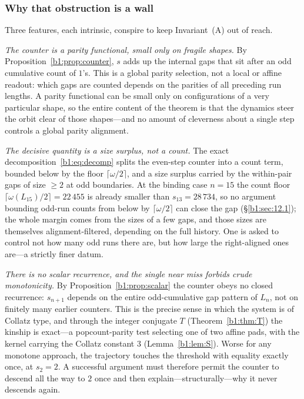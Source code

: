 \documentclass[a4paper]{article}
\theoremstyle{plain}
\theoremstyle{definition}
\theoremstyle{remark}
\begin{document}
\subsubsection{Why that obstruction is a wall}\label{b1:sec:13.2}
Three features, each intrinsic, conspire to keep Invariant~(A) out of reach.

\emph{The counter is a parity functional, small only on fragile shapes.} By Proposition~\ref{b1:prop:counter}, $s$ adds up the internal gaps that sit after an odd cumulative count of $1$'s. This is a global parity selection, not a local or affine readout: which gaps are counted depends on the parities of all preceding run lengths. A parity functional can be small only on configurations of a very particular shape, so the entire content of the theorem is that the dynamics steer the orbit clear of those shapes---and no amount of cleverness about a single step controls a global parity alignment.

\emph{The decisive quantity is a size surplus, not a count.} The exact decomposition~\eqref{b1:eq:decomp} splits the even-step counter into a count term, bounded below by the floor $\lceil\omega/2\rceil$, and a size surplus carried by the within-pair gaps of size $\ge 2$ at odd boundaries. At the binding case $n=15$ the count floor $\lceil\omega(L_{15})/2\rceil=22\,455$ is already smaller than $s_{13}=28\,734$, so no argument bounding odd-run counts from below by $\lceil\omega/2\rceil$ can close the gap (\S\ref{b1:sec:12.1}); the whole margin comes from the sizes of a few gaps, and those sizes are themselves alignment-filtered, depending on the full history. One is asked to control not how many odd runs there are, but how large the right-aligned ones are---a strictly finer datum.

\emph{There is no scalar recurrence, and the single near miss forbids crude monotonicity.} By Proposition~\ref{b1:prop:scalar} the counter obeys no closed recurrence: $s_{n+1}$ depends on the entire odd-cumulative gap pattern of $L_n$, not on finitely many earlier counters. This is the precise sense in which the system is of Collatz type, and through the integer conjugate $T$ (Theorem~\ref{b1:thm:T}) the kinship is exact---a popcount-parity test selecting one of two affine pads, with the kernel carrying the Collatz constant $3$ (Lemma~\ref{b1:lem:S}). Worse for any monotone approach, the trajectory touches the threshold with equality exactly once, at $s_2=2$. A successful argument must therefore permit the counter to descend all the way to $2$ once and then explain---structurally---why it never descends again.
\end{document}
